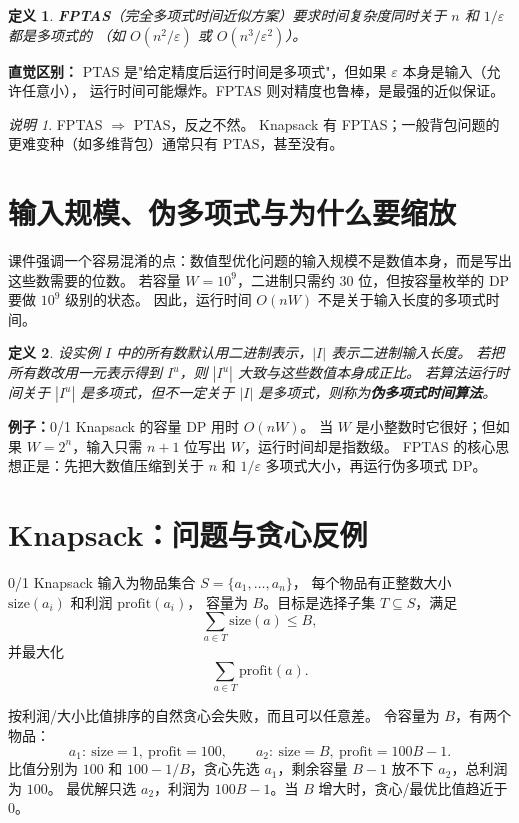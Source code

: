 \documentclass[UTF8,openany,12pt]{ctexbook}
\newtheorem{definition}{定义}[chapter]
\theoremstyle{remark}
\newtheorem{remark}{说明}[chapter]
\begin{document}
\begin{definition}
\textbf{FPTAS}（完全多项式时间近似方案）要求时间复杂度同时关于 $n$ 和 $1/\varepsilon$ 都是多项式的
（如 $O(n^2/\varepsilon)$ 或 $O(n^3/\varepsilon^2)$）。
\end{definition}

\textbf{直觉区别：}
PTAS 是"给定精度后运行时间是多项式"，但如果 $\varepsilon$ 本身是输入（允许任意小），
运行时间可能爆炸。FPTAS 则对精度也鲁棒，是最强的近似保证。

\begin{remark}
FPTAS $\Rightarrow$ PTAS，反之不然。
Knapsack 有 FPTAS；一般背包问题的更难变种（如多维背包）通常只有 PTAS，甚至没有。
\end{remark}

\section{输入规模、伪多项式与为什么要缩放}

课件强调一个容易混淆的点：数值型优化问题的输入规模不是数值本身，而是写出这些数需要的位数。
若容量 $W=10^9$，二进制只需约 $30$ 位，但按容量枚举的 DP 要做 $10^9$ 级别的状态。
因此，运行时间 $O(nW)$ 不是关于输入长度的多项式时间。

\begin{definition}
设实例 $I$ 中的所有数默认用二进制表示，$|I|$ 表示二进制输入长度。
若把所有数改用一元表示得到 $I^u$，则 $|I^u|$ 大致与这些数值本身成正比。
若算法运行时间关于 $|I^u|$ 是多项式，但不一定关于 $|I|$ 是多项式，则称为\textbf{伪多项式时间算法}。
\end{definition}

\textbf{例子：}0/1 Knapsack 的容量 DP 用时 $O(nW)$。
当 $W$ 是小整数时它很好；但如果 $W=2^n$，输入只需 $n+1$ 位写出 $W$，运行时间却是指数级。
FPTAS 的核心思想正是：先把大数值压缩到关于 $n$ 和 $1/\varepsilon$ 多项式大小，再运行伪多项式 DP。

\section{Knapsack：问题与贪心反例}

0/1 Knapsack 输入为物品集合 $S=\{a_1,\dots,a_n\}$，
每个物品有正整数大小 $\mathrm{size}(a_i)$ 和利润 $\mathrm{profit}(a_i)$，
容量为 $B$。目标是选择子集 $T\subseteq S$，满足
\[
  \sum_{a\in T}\mathrm{size}(a)\le B,
\]
并最大化
\[
  \sum_{a\in T}\mathrm{profit}(a).
\]

按利润/大小比值排序的自然贪心会失败，而且可以任意差。
令容量为 $B$，有两个物品：
\[
  a_1:\ \mathrm{size}=1,\ \mathrm{profit}=100,\qquad
  a_2:\ \mathrm{size}=B,\ \mathrm{profit}=100B-1.
\]
比值分别为 $100$ 和 $100-1/B$，贪心先选 $a_1$，剩余容量 $B-1$ 放不下 $a_2$，总利润为 $100$。
最优解只选 $a_2$，利润为 $100B-1$。当 $B$ 增大时，贪心/最优比值趋近于 $0$。
\end{document}
